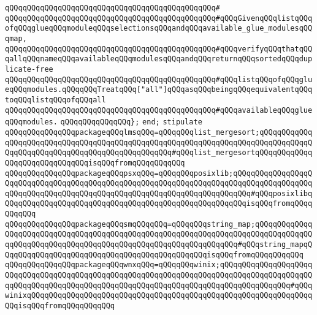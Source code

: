 \verb|qQQqqQQqqQQqqQQqqQQqqQQqqQQqqQQqqQQqqQQqqQQqqQQq#|\newline
\verb|qQQqqQQqqQQqqQQqqQQqqQQqqQQqqQQqqQQqqQQqqQQqqQQq#qQQqGivenqQQqlistqQQqofqQQqglueqQQqmoduleqQQqselectionsqQQqandqQQqavailable_glue_modulesqQQqmap,|\newline
\verb|qQQqqQQqqQQqqQQqqQQqqQQqqQQqqQQqqQQqqQQqqQQqqQQq#qQQqverifyqQQqthatqQQqallqQQqnameqQQqavailableqQQqmodulesqQQqandqQQqreturnqQQqsortedqQQqduplicate-free|\newline
\verb|qQQqqQQqqQQqqQQqqQQqqQQqqQQqqQQqqQQqqQQqqQQqqQQq#qQQqlistqQQqofqQQqglueqQQqmodules.qQQqqQQqTreatqQQq["all"]qQQqasqQQqbeingqQQqequivalentqQQqtoqQQqlistqQQqofqQQqall|\newline
\verb|qQQqqQQqqQQqqQQqqQQqqQQqqQQqqQQqqQQqqQQqqQQqqQQq#qQQqavailableqQQqglueqQQqmodules.|\newline
\verb|qQQqqQQqqQQqqQQq};|\newline
\verb|end;|\newline
\newline
\verb|stipulate|\newline
\verb|qQQqqQQqqQQqqQQqpackageqQQqlmsqQQq=qQQqqQQqlist_mergesort;qQQqqQQqqQQqqQQqqQQqqQQqqQQqqQQqqQQqqQQqqQQqqQQqqQQqqQQqqQQqqQQqqQQqqQQqqQQqqQQqqQQqqQQqqQQqqQQqqQQqqQQqqQQqqQQqqQQqqQQq#qQQqlist_mergesortqQQqqQQqqQQqqQQqqQQqqQQqqQQqqQQqisqQQqfromqQQqqQQqqQQq|\newline
\verb|qQQqqQQqqQQqqQQqpackageqQQqpsxqQQq=qQQqqQQqposixlib;qQQqqQQqqQQqqQQqqQQqqQQqqQQqqQQqqQQqqQQqqQQqqQQqqQQqqQQqqQQqqQQqqQQqqQQqqQQqqQQqqQQqqQQqqQQqqQQqqQQqqQQqqQQqqQQqqQQqqQQqqQQqqQQqqQQqqQQqqQQqqQQq#qQQqposixlibqQQqqQQqqQQqqQQqqQQqqQQqqQQqqQQqqQQqqQQqqQQqqQQqqQQqqQQqisqQQqfromqQQqqQQqqQQq|\newline
\verb|qQQqqQQqqQQqqQQqpackageqQQqsmqQQqqQQq=qQQqqQQqstring_map;qQQqqQQqqQQqqQQqqQQqqQQqqQQqqQQqqQQqqQQqqQQqqQQqqQQqqQQqqQQqqQQqqQQqqQQqqQQqqQQqqQQqqQQqqQQqqQQqqQQqqQQqqQQqqQQqqQQqqQQqqQQqqQQqqQQqqQQq#qQQqstring_mapqQQqqQQqqQQqqQQqqQQqqQQqqQQqqQQqqQQqqQQqqQQqqQQqisqQQqfromqQQqqQQqqQQq|\newline
\verb|qQQqqQQqqQQqqQQqpackageqQQqwnxqQQq=qQQqqQQqwinix;qQQqqQQqqQQqqQQqqQQqqQQqqQQqqQQqqQQqqQQqqQQqqQQqqQQqqQQqqQQqqQQqqQQqqQQqqQQqqQQqqQQqqQQqqQQqqQQqqQQqqQQqqQQqqQQqqQQqqQQqqQQqqQQqqQQqqQQqqQQqqQQqqQQqqQQqqQQq#qQQqwinixqQQqqQQqqQQqqQQqqQQqqQQqqQQqqQQqqQQqqQQqqQQqqQQqqQQqqQQqqQQqqQQqqQQqisqQQqfromqQQqqQQqqQQq|\newline

